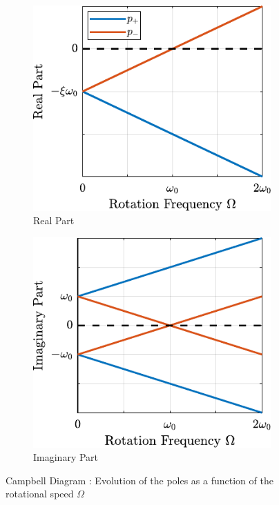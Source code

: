 \documentclass{ISMA_USD2020}
\begin{document}
\begin{figure}[htbp]
\begin{subfigure}[c]{0.4\linewidth}
\includegraphics[width=\linewidth]{figs/campbell_diagram_real.pdf}
\caption{\label{fig:campbell_diagram_real} Real Part}
\end{subfigure}
\begin{subfigure}[c]{0.4\linewidth}
\includegraphics[width=\linewidth]{figs/campbell_diagram_imag.pdf}
\caption{\label{fig:campbell_diagram_imag} Imaginary Part}
\end{subfigure}
\caption{\label{fig:campbell_diagram}Campbell Diagram : Evolution of the poles as a function of the rotational speed \(\Omega\)}
\centering
\end{figure}
\end{document}
